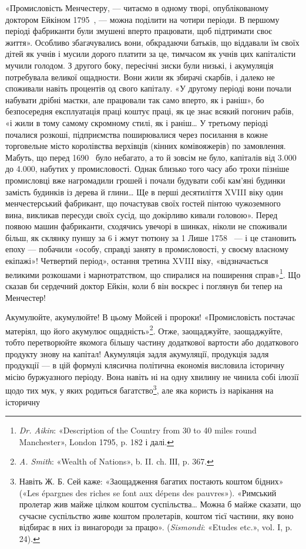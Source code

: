 «Промисловість Менчестеру, — читаємо в одному творі, опублікованому
доктором Ейкіном 1795~, — можна поділити на
чотири періоди. В першому періоді фабриканти були змушені
вперто працювати, щоб підтримати своє життя». Особливо збагачувались
вони, обкрадаючи батьків, що віддавали їм своїх дітей
як учнів і мусили дорого платити за це, тимчасом як учнів цих
капіталісти мучили голодом. З другого боку, пересічні зиски
були низькі, і акумуляція потребувала великої ощадности.
Вони жили як збирачі скарбів, і далеко не споживали навіть
процентів од свого капіталу. «У другому періоді вони почали
набувати дрібні маєтки, але працювали так само вперто, як і
раніш», бо безпосередня експлуатація праці коштує праці, як
це знає всякий погонич рабів, «і жили в тому самому скромному
стилі, як і раніш\dots{} У третьому періоді почалися розкоші, підприємства
поширювалися через посилання в кожне торговельне
місто королівства верхівців (кінних комівояжерів) по замовлення.
Мабуть, що перед 1690~ було небагато, а то й зовсім не було,
капіталів від \num{3.000} до \num{4.000}, набутих у промисловості.
Однак близько того часу або трохи пізніше промисловці
вже нагромадили грошей і почали будувати собі кам’яні
будинки замість будинків із дерева й глини\dots{} Ще в перші десятиліття
XVIII віку один менчестерський фабрикант, що почастував
своїх гостей пінтою чужоземного вина, викликав пересуди
своїх сусід, що докірливо кивали головою». Перед появою машин
фабриканти, сходячись увечорі в шинках, ніколи не споживали
більш, як склянку пуншу за 6 і жмут тютюну за 1
Лише 1758~ — і це становить епоху — побачили «особу, справді
заняту в промисловості, у своєму власному екіпажі»! Четвертий
період», остання третина XVIII віку, «відзначається великими
розкошами і марнотратством, що спиралися на поширення
справ»\footnote{
\emph{Dr. Aikin}: «Description of the Country from 30 to 40 miles round
Manchester», London 1795, p. 182 і далі.
}. Що сказав би сердечний доктор Ейкін, коли б він
воскрес і поглянув би тепер на Менчестер!

Акумулюйте, акумулюйте! В цьому Мойсей і пророки! «Промисловість
постачає матеріял, що його акумулює ощадність»\footnote{
\emph{A. Smith}: «Wealth of Nations», b. II. ch. ІІІ, p. 367.
}.
Отже, заощаджуйте, заощаджуйте, тобто перетворюйте якомога
більшу частину додаткової вартости або додаткового продукту
знову на капітал! Акумуляція задля акумуляції, продукція
задля продукції — в цій формулі клясична політична економія
висловила історичну місію буржуазного періоду. Вона навіть ні
на одну хвилину не чинила собі ілюзії щодо тих мук, у яких родиться
багатство\footnote{
Навіть Ж. Б. Сей каже: «Заощадження багатих постають коштом
бідних» («Les épargnes des riches se font aux dépens des pauvres»). «Римський
пролетар жив майже цілком коштом суспільства\dots{} Можна б майже
сказати, що сучасне суспільство живе коштом пролетарів, коштом тієї
частини, яку воно відбирає в них із винагороди за працю». (\emph{Sismondi}:
«Etudes etc.», vol. I, p. 24).
}, але яка користь із нарікання на історичну
\parbreak{}  %
